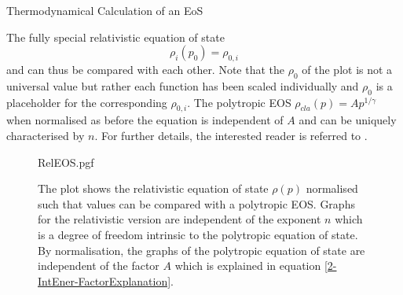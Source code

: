 \begin{section}{Thermodynamical Calculation of an EoS}
\begin{subsection}{The fully special relativistic equation of state}
\begin{equation}
	\rho_{i}(p_0)=\rho_{0,i}
\end{equation}
and can thus be compared with each other. Note that the $\rho_0$ of the plot is not a universal value but rather each function has been scaled individually and $\rho_0$ is a placeholder for the corresponding $\rho_{0,i}$. The polytropic EOS $\rho_{cla}(p)=Ap^{1/\gamma}$ when normalised as before the equation is independent of $A$ and can be uniquely characterised by $n$. For further details, the interested reader is referred to \cite{pleyerGithubRepositoryJonas}.
\begin{figure}[H]
	\centering
	{RelEOS.pgf}
	\caption[Relativistic Equation of State]{The plot shows the relativistic equation of state $\rho(p)$ normalised such that values can be compared with a polytropic EOS. Graphs for the relativistic version are independent of the exponent $n$ which is a degree of freedom intrinsic to the polytropic equation of state. By normalisation, the graphs of the polytropic equation of state are independent of the factor $A$ which is explained in equation \ref{2-IntEner-FactorExplanation}.}
	\label{2-IntEner-RelEOSPlot}
\end{figure}
\end{subsection}
%
%
\end{section}
